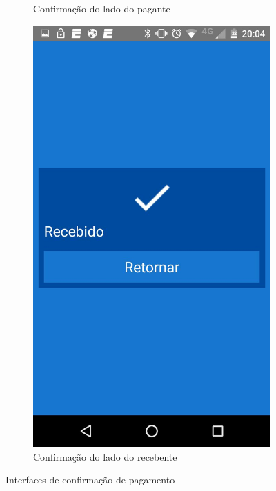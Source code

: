 \documentclass[hidelinks,12pt]{article}
\begin{document}
\begin{figure}[H]
\begin{subfigure}{0.5\textwidth}
		\caption{Confirma\c{c}\~ao do lado do pagante}
		\label{pay_p}
	\end{subfigure}
	\begin{subfigure}{0.5\textwidth}
		\includegraphics[scale=0.3]{pay_receive}
		\caption{Confirma\c{c}\~ao do lado do recebente}
		\label{pay_r}
	\end{subfigure}
	\caption{Interfaces de confirma\c{c}\~ao de pagamento}
	\label{pay}
\end{figure}
\end{document}
